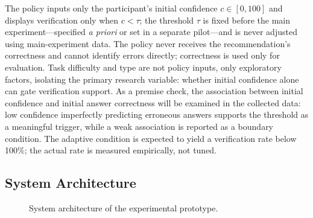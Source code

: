 \documentclass[oneside,final,14pt,a4paper]{extreport}
\begin{document}
The policy inputs only the participant's initial confidence $c\in[0,100]$ and
displays verification only when $c<\tau$; the threshold $\tau$ is fixed before
the main experiment---specified \emph{a priori} or set in a separate
pilot---and is never adjusted using main-experiment data. The policy never
receives the recommendation's correctness and cannot identify errors directly;
correctness is used only for evaluation. Task difficulty and type are not
policy inputs, only exploratory factors, isolating the primary research
variable: whether initial confidence alone can gate verification support. As a
premise check, the association between initial confidence and initial answer
correctness will be examined in the collected data: low confidence imperfectly
predicting erroneous answers supports the threshold as a meaningful trigger,
while a weak association is reported as a boundary condition. The adaptive
condition is expected to yield a verification rate below 100\%; the actual
rate is measured empirically, not tuned.

\subsection{System Architecture}

\begin{figure}[H]
\centering
{}
\caption{System architecture of the experimental prototype.}
\label{fig:architecture}
\end{figure}
\end{document}
